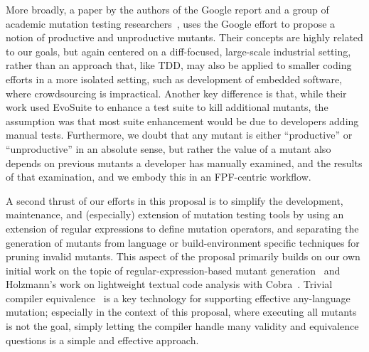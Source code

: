More broadly, a paper by the
authors of the Google report and a group of academic mutation testing
researchers~\cite{ivankovic2018industrial}, uses the Google effort to
propose a notion of productive and unproductive mutants.  Their
concepts are highly related to our goals, but again centered on a
diff-focused, large-scale industrial setting, rather than an approach
that, like TDD, may also be applied to smaller coding efforts in a more
isolated setting, such as development of embedded software, where
crowdsourcing is impractical.  Another key difference is that, while their
work used EvoSuite to enhance a test suite to kill additional mutants,
the assumption was that most suite enhancement would be due to
developers adding manual tests.  Furthermore, we doubt that any mutant
is either ``productive'' or ``unproductive'' in an absolute sense, but
rather the value of a mutant also depends on previous mutants a
developer has manually examined, and the results of that examination,
and we embody this in an FPF-centric workflow.

A second thrust of our efforts in this proposal is to simplify the
development, maintenance, and (especially) extension of mutation
testing tools by using an extension of regular expressions to define
mutation operators, and separating the generation of mutants from
language or build-environment specific techniques for pruning invalid
mutants.  This aspect of the proposal primarily builds on our own initial work on the topic of
regular-expression-based mutant generation~\cite{regexpMut} and
Holzmann's work on lightweight textual code analysis with
Cobra~\cite{Cobra}.  Trivial compiler equivalence~\cite{TCE} is a key
technology for supporting effective any-language mutation; especially
in the context of this proposal, where executing all mutants is not
the goal, simply letting the compiler handle many validity and
equivalence questions is a simple and effective approach.